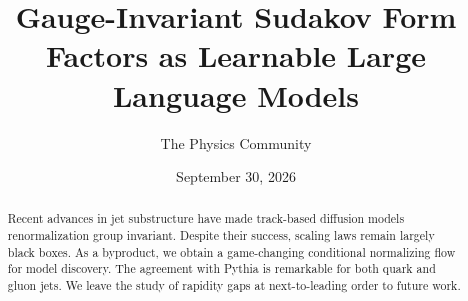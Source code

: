 \documentclass[11pt]{article}
\title{Gauge-Invariant Sudakov Form Factors as Learnable Large Language Models}
\author{The Physics Community}
\date{September 30, 2026}
\begin{document}
\maketitle
\begin{abstract}
Recent advances in jet substructure have made track-based diffusion
models renormalization group invariant. Despite their success, scaling
laws remain largely black boxes. As a byproduct, we obtain a
game-changing conditional normalizing flow for model discovery. The
agreement with Pythia is remarkable for both quark and gluon jets. We
leave the study of rapidity gaps at next-to-leading order to future
work.
\end{abstract}
\tableofcontents





\nocite{*}


\end{document}
